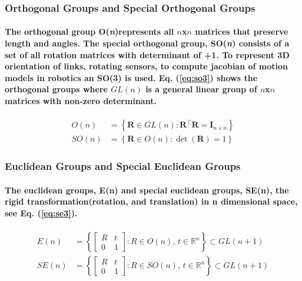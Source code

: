 \subsubsection{Orthogonal Groups and Special Orthogonal Groups}
\paragraph{\textnormal{The orthogonal group O(\textit{\textit{n}})represents all $n$x$n$ matrices that preserve length and angles. The special orthogonal group, SO(\textit{n}) consists of a set of all rotation matrices with determinant of +1. To represent 3D orientation of links, rotating sensors, to compute jacobian of motion models in robotics an SO(3) is used. Eq. (\ref{eq:so3}) shows the orthogonal groups where $GL(n)$ is a general linear group of $n$x$n$ matrices with non-zero determinant.}} 
\begin{equation}
	\begin{aligned}
		O(n) &= \left\{ \mathbf{R} \in GL(n) : \mathbf{R}^{\top} \mathbf{R} = \mathbf{I}_{n \times n} \right\} \\
		SO(n) &= \left\{ \mathbf{R} \in O(n) : \det(\mathbf{R}) = 1 \right\}
	\end{aligned}	
	\label{eq:so3}
\end{equation}
\subsubsection{Euclidean Groups and Special Euclidean Groups}
\paragraph{\textnormal{The euclidean groups, E(n) and special euclidean groups, SE(n), the rigid transformation(rotation, and translation) in n dimensional space, see Eq. (\ref{eq:se3}).}}
\begin{equation}
\begin{aligned}
	E(n) &= \left\{ \begin{bmatrix} R & t \\ 0 & 1 \end{bmatrix} : R \in O(n), \, t \in \mathbb{R}^n \right\} \subset GL(n+1) \\
	SE(n) &= \left\{ \begin{bmatrix} R & t \\ 0 & 1 \end{bmatrix} : R \in SO(n), \, t \in \mathbb{R}^n \right\} \subset GL(n+1)
\end{aligned}
\label{eq:se3}
\end{equation}

